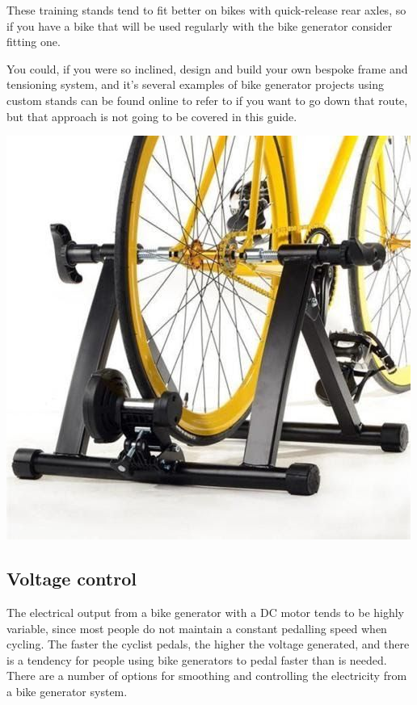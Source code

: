 \documentclass{article}
\theoremstyle{definition}
\theoremstyle{definition}
\theoremstyle{remark}
\begin{document}
    These training stands tend to fit better on bikes with quick-release rear axles, so if you have a bike that will be used regularly with the bike generator consider fitting one. 

    You could, if you were so inclined, design and build your own bespoke frame and tensioning system, and it’s several examples of bike generator projects using custom stands can be found online to refer to if you want to go down that route, but that approach is not going to be covered in this guide.
  
    \begin{center}
      \includegraphics[width=0.25\paperwidth]{../Images/image_3_2_(training_stands).png}
    \end{center}
  

  {\color{blue}\subsection{Voltage control}} %
  \label{sub:voltage_control}

    The electrical output from a bike generator with a DC motor tends to be highly variable, since most people do not maintain a constant pedalling speed when cycling. The faster the cyclist pedals, the higher the voltage generated, and there is a tendency for people using bike generators to pedal faster than is needed. There are a number of options for smoothing and controlling the electricity from a bike generator system.
\end{document}
